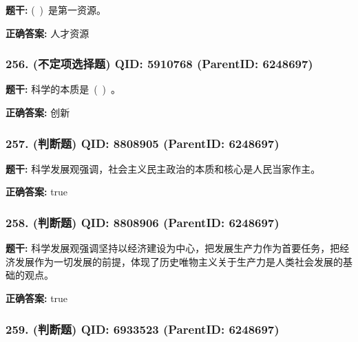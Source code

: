 \documentclass[12pt,UTF8]{ctexart}
\begin{document}
\textbf{题干:}
( ) 是第一资源。



\textbf{正确答案:}
人才资源

\vspace{0.3em}\hrulefill\vspace{0.7em}

\subsubsection*{256. (不定项选择题) \small QID: 5910768 (ParentID: 6248697)}

\textbf{题干:}
科学的本质是 ( ) 。



\textbf{正确答案:}
创新

\vspace{0.3em}\hrulefill\vspace{0.7em}

\subsubsection*{257. (判断题) \small QID: 8808905 (ParentID: 6248697)}

\textbf{题干:}
科学发展观强调，社会主义民主政治的本质和核心是人民当家作主。



\textbf{正确答案:}
true

\vspace{0.3em}\hrulefill\vspace{0.7em}

\subsubsection*{258. (判断题) \small QID: 8808906 (ParentID: 6248697)}

\textbf{题干:}
科学发展观强调坚持以经济建设为中心，把发展生产力作为首要任务，把经济发展作为一切发展的前提，体现了历史唯物主义关于生产力是人类社会发展的基础的观点。



\textbf{正确答案:}
true

\vspace{0.3em}\hrulefill\vspace{0.7em}

\subsubsection*{259. (判断题) \small QID: 6933523 (ParentID: 6248697)}
\end{document}
